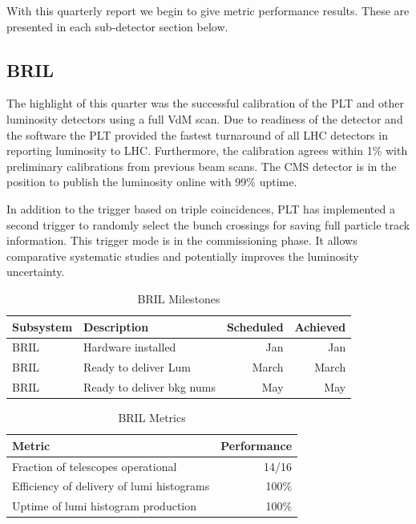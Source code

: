 With this quarterly report we begin to give metric performance results.   These are presented in each sub-detector section below.  

\subsection{BRIL }
The highlight of this quarter was the successful calibration of the PLT and other luminosity
detectors using a full VdM scan. Due to readiness of the detector and the software the PLT
provided the fastest turnaround of all LHC detectors in reporting luminosity to LHC. 
Furthermore, the calibration agrees within 1\% with preliminary calibrations from previous beam 
scans. The CMS detector is in the position to publish the luminosity online with 99\% uptime. 

In addition to the trigger based on 
triple coincidences, PLT has implemented a second trigger to randomly select the bunch crossings 
for saving full particle track information. This trigger mode is in the commissioning phase. It
allows comparative systematic studies and potentially improves the luminosity uncertainty. 

\begin{table}[htp]
\caption{BRIL Milestones}
\begin{center}
\begin{tabular}{|l|l|r|r|}
\hline
Subsystem&Description&Scheduled&Achieved\\
\hline
BRIL & Hardware installed& Jan & Jan\\
\hline
BRIL& Ready to deliver Lum& March & March \\
\hline
BRIL & Ready to deliver bkg nums& May & May\\
\hline
\end{tabular}
\end{center}
\label{BRILMIlestones}
\end{table}%

\begin{table}[htp]
\caption{BRIL Metrics}
\begin{center}
\begin{tabular}{|l|r|}
\hline
Metric&Performance\\
\hline
Fraction of telescopes operational & 14/16\\
\hline
Efficiency of delivery of lumi histograms &100\% \\
\hline
Uptime of lumi  histogram production &100\% \\
\hline
\end{tabular}
\end{center}
\label{BRILMetrics}
\end{table}%

